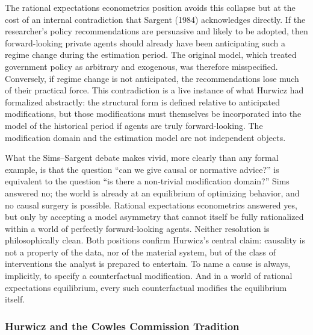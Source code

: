 \documentclass[12pt]{article}
\begin{document}
The rational expectations econometrics position avoids this collapse but at the cost of
an internal contradiction that Sargent (1984) acknowledges directly.  If the
researcher's policy recommendations are persuasive and likely to be adopted, then
forward-looking private agents should already have been anticipating such a regime change
during the estimation period.  The original model, which treated government policy as
arbitrary and exogenous, was therefore misspecified.  Conversely, if regime change is not
anticipated, the recommendations lose much of their practical force.  This contradiction is
a live instance of what Hurwicz had formalized abstractly: the structural form is defined
relative to anticipated modifications, but those modifications must themselves be
incorporated into the model of the historical period if agents are truly forward-looking.
The modification domain and the estimation model are not independent objects.

What the Sims--Sargent debate makes vivid, more clearly than any formal example, is that
the question ``can we give causal or normative advice?'' is equivalent to the question
``is there a non-trivial modification domain?''  Sims answered no; the world is already at
an equilibrium of optimizing behavior, and no causal surgery is possible.  Rational
expectations econometrics answered yes, but only by accepting a model asymmetry that
cannot itself be fully rationalized within a world of perfectly forward-looking agents.
Neither resolution is philosophically clean.  Both positions confirm Hurwicz's central
claim: causality is not a property of the data, nor of the material system, but of the class
of interventions the analyst is prepared to entertain.  To name a cause is always,
implicitly, to specify a counterfactual modification.  And in a world of rational
expectations equilibrium, every such counterfactual modifies the equilibrium itself.

\bigskip

\subsubsection{Hurwicz and the Cowles Commission Tradition}
\end{document}
